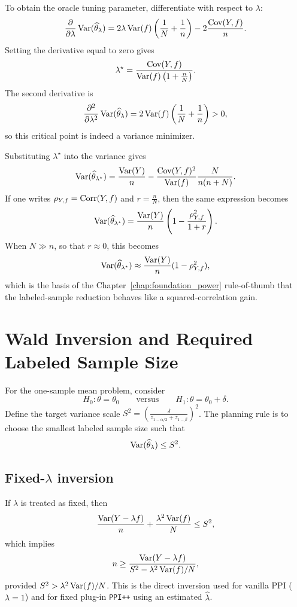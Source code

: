 To obtain the oracle tuning parameter, differentiate with respect to $\lambda$:
\[
\frac{\partial}{\partial \lambda}\operatorname{Var}(\widehat{\theta}_{\lambda})
=
2\lambda\operatorname{Var}(f)\left(\frac{1}{N}+\frac{1}{n}\right)
-2\frac{\operatorname{Cov}(Y,f)}{n}.
\]
Setting the derivative equal to zero gives
\[
\lambda^\star
=
\frac{\operatorname{Cov}(Y,f)}
{\operatorname{Var}(f)\left(1+\frac{n}{N}\right)}.
\]
The second derivative is
\[
\frac{\partial^2}{\partial \lambda^2}\operatorname{Var}(\widehat{\theta}_{\lambda})
=
2\operatorname{Var}(f)\left(\frac{1}{N}+\frac{1}{n}\right)>0,
\]
so this critical point is indeed a variance minimizer.

Substituting $\lambda^\star$ into the variance gives
\[
\operatorname{Var}(\widehat{\theta}_{\lambda^\star})
=
\frac{\operatorname{Var}(Y)}{n}
-
\frac{\operatorname{Cov}(Y,f)^2}{\operatorname{Var}(f)}
\frac{N}{n(n+N)}.
\]
If one writes \(\rho_{Y,f}=\operatorname{Corr}(Y,f)\) and \(r=\frac{n}{N}\), then the same expression becomes
\[
\operatorname{Var}(\widehat{\theta}_{\lambda^\star})
=
\frac{\operatorname{Var}(Y)}{n}
\left(
1-\frac{\rho_{Y,f}^2}{1+r}
\right).
\]
When $N\gg n$, so that $r\approx 0$, this becomes
\[
\operatorname{Var}(\widehat{\theta}_{\lambda^\star})
\approx
\frac{\operatorname{Var}(Y)}{n}(1-\rho_{Y,f}^2),
\]
which is the basis of the Chapter~\ref{chap:foundation_power} rule-of-thumb that the labeled-sample reduction behaves like a squared-correlation gain.

\section{Wald Inversion and Required Labeled Sample Size}

For the one-sample mean problem, consider
\[
H_0:\theta=\theta_0
\qquad\text{versus}\qquad
H_1:\theta=\theta_0+\delta.
\]
Define the target variance scale \(S^2=\left(\frac{\delta}{z_{1-\alpha/2}+z_{1-\beta}}\right)^2\).
The planning rule is to choose the smallest labeled sample size such that
\[
\operatorname{Var}(\widehat{\theta}_{\lambda})\le S^2.
\]

\subsection{Fixed-\texorpdfstring{$\lambda$}{lambda} inversion}

If $\lambda$ is treated as fixed, then
\[
\frac{\operatorname{Var}(Y-\lambda f)}{n}
+
\frac{\lambda^2\operatorname{Var}(f)}{N}
\le S^2,
\]
which implies
\[
n
\ge
\frac{\operatorname{Var}(Y-\lambda f)}
{S^2-\lambda^2\operatorname{Var}(f)/N},
\]
provided $S^2>\lambda^2\operatorname{Var}(f)/N$. This is the direct inversion used for vanilla PPI ($\lambda=1$) and for fixed plug-in \texttt{PPI++} using an estimated $\widehat{\lambda}$.

